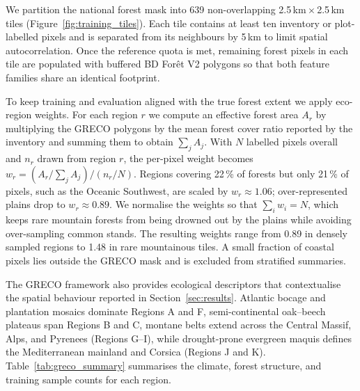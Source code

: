 \documentclass[utf8]{FrontiersinHarvard}
\begin{document}
We partition the national forest mask into 639 non-overlapping 2.5\,km\,$\times$\,2.5\,km tiles (Figure~\ref{fig:training_tiles}). Each tile contains at least ten inventory or plot-labelled pixels and is separated from its neighbours by 5\,km to limit spatial autocorrelation. Once the reference quota is met, remaining forest pixels in each tile are populated with buffered BD Forêt V2 polygons so that both feature families share an identical footprint.

To keep training and evaluation aligned with the true forest extent we apply eco-region weights. For each region \(r\) we compute an effective forest area \(A_r\) by multiplying the GRECO polygons by the mean forest cover ratio reported by the inventory and summing them to obtain \(\sum_j A_j\). With \(N\) labelled pixels overall and \(n_r\) drawn from region \(r\), the per-pixel weight becomes \(w_r = (A_r / \sum_j A_j) / (n_r / N)\). Regions covering 22\,\% of forests but only 21\,\% of pixels, such as the Oceanic Southwest, are scaled by \(w_r \approx 1.06\); over-represented plains drop to \(w_r \approx 0.89\). We normalise the weights so that \(\sum_i w_i = N\), which keeps rare mountain forests from being drowned out by the plains while avoiding over-sampling common stands. The resulting weights range from 0.89 in densely sampled regions to 1.48 in rare mountainous tiles. A small fraction of coastal pixels lies outside the GRECO mask and is excluded from stratified summaries.

The GRECO framework also provides ecological descriptors that contextualise the spatial behaviour reported in Section~\ref{sec:results}. Atlantic bocage and plantation mosaics dominate Regions A and F, semi-continental oak–beech plateaus span Regions B and C, montane belts extend across the Central Massif, Alps, and Pyrenees (Regions G–I), while drought-prone evergreen maquis defines the Mediterranean mainland and Corsica (Regions J and K). Table~\ref{tab:greco_summary} summarises the climate, forest structure, and training sample counts for each region.
\end{document}
